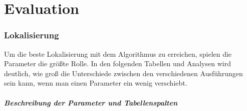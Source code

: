 \chapter{Evaluation}
\label{cha:evaluation}

\subsection{Lokalisierung}

Um die beste Lokalisierung mit dem Algorithmus zu erreichen, spielen die Parameter die größte Rolle. In den folgenden Tabellen und Analysen wird deutlich, wie groß die Unterschiede zwischen den verschiedenen Ausführungen sein kann, wenn man einen Parameter ein wenig verschiebt.

\paragraph{Beschreibung der Parameter und Tabellenspalten}



